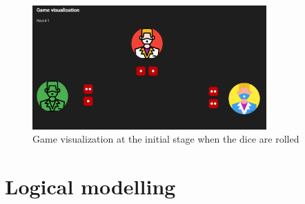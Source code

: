 \documentclass{article}
\begin{document}
\begin{figure}[h]
    \includegraphics[width=0.8\textwidth]{img/GV1.png}
    \centering
    \caption{Game visualization at the initial stage when the dice are rolled}
    \label{fig:liarsdiceGV}
\end{figure}



\section*{Logical modelling}
\end{document}
